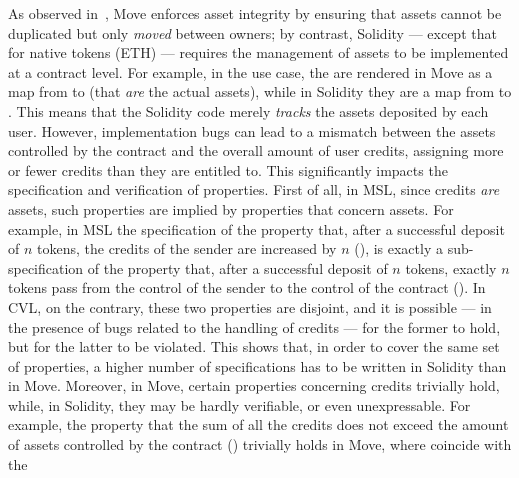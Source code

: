 As observed in~, 
Move enforces asset integrity by ensuring that assets cannot be duplicated
but only \emph{moved} between owners;
by contrast, Solidity --- except that for native tokens (ETH) --- requires the management of assets to be implemented at a contract level.
%
For example, in the  use case, 
the  are rendered in Move as a map from  to  (that \emph{are} the actual assets), %
while in Solidity they are
a map from  to .
This means that the Solidity code merely \emph{tracks} the assets deposited by each user. However, implementation bugs can lead to a mismatch between the assets controlled by the contract and the overall amount of user credits, assigning more or fewer credits than they are entitled to. 
This significantly impacts the specification and verification of properties.
First of all, in MSL, since credits \emph{are}  assets, such properties are implied by properties that concern assets. 
For example, in MSL the specification  of the property that, after a successful deposit of $n$ tokens, the credits of the sender are increased by $n$ (), 
is exactly 
a sub-specification of the property that, after a successful deposit of $n$ tokens, exactly $n$ tokens pass from the control of the sender to the control of the contract  (). %
In CVL, on the contrary, these two properties are disjoint, and it is possible --- in the presence of bugs related to the handling of credits --- for the former to hold, but for the latter to be violated.
This shows that, in order to cover the same set of properties,  a higher number of specifications has to be written  in Solidity than in Move.
Moreover, in Move, certain properties concerning credits trivially hold, while, in Solidity, they may be hardly verifiable, or even unexpressable.
For example,  the property that the sum of all the credits  does not exceed the amount of assets controlled by the contract ()
trivially holds in Move, where  coincide with the 
